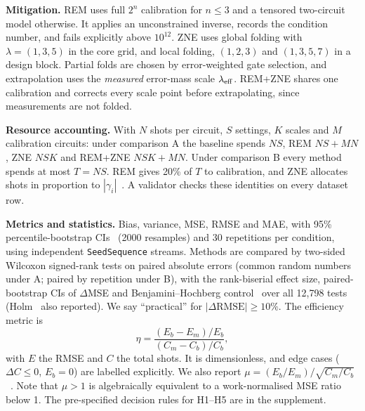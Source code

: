 \documentclass[11pt]{article}
\begin{document}
\textbf{Mitigation.} REM uses full $2^n$ calibration for $n\le3$ and a tensored two-circuit model otherwise. It applies an unconstrained inverse,
records the condition number, and fails explicitly above $10^{12}$. ZNE uses global folding with $\lambda=(1,3,5)$ in the core grid, and local folding,
$(1,2,3)$ and $(1,3,5,7)$ in a design block. Partial folds are chosen by error-weighted gate selection, and extrapolation uses the
\emph{measured} error-mass scale $\lambda_{\rm eff}$. REM+ZNE shares one calibration and corrects every scale point before extrapolating, since
measurements are not folded.

\textbf{Resource accounting.} With $N$ shots per circuit, $S$ settings, $K$ scales and $M$ calibration circuits: under comparison A the baseline spends
$NS$, REM $NS+MN$, ZNE $NSK$ and REM+ZNE $NSK+MN$. Under comparison B every method spends at most $T=NS$. REM gives 20\% of $T$ to calibration,
and ZNE allocates shots in proportion to $|\gamma_i|$~\cite{krebsbach2022}. A validator checks these identities on every dataset row.

\textbf{Metrics and statistics.} Bias, variance, MSE, RMSE and MAE, with 95\% percentile-bootstrap CIs~\cite{efron1993} (2000 resamples) and 30
repetitions per condition, using independent \texttt{SeedSequence} streams. Methods are compared by two-sided Wilcoxon signed-rank tests on
paired absolute errors (common random numbers under A; paired by repetition under B), with the rank-biserial effect size, paired-bootstrap
CIs of $\Delta$MSE and Benjamini--Hochberg control~\cite{bh1995} over all 12{,}798 tests (Holm~\cite{holm1979} also reported). We say ``practical''
for $|\Delta\mathrm{RMSE}|\ge10\%$. The efficiency metric is
\begin{equation}
\eta=\frac{(E_b-E_m)/E_b}{(C_m-C_b)/C_b},
\end{equation}
with $E$ the RMSE and $C$ the total shots. It is dimensionless, and edge cases ($\Delta C\le0$, $E_b=0$) are labelled explicitly. We also report $\mu=(E_b/E_m)/\sqrt{C_m/C_b}$~\cite{russo2023}.
Note that $\mu>1$ is algebraically equivalent to a work-normalised MSE ratio below 1. The pre-specified decision rules for H1--H5 are in the supplement.
\end{document}
